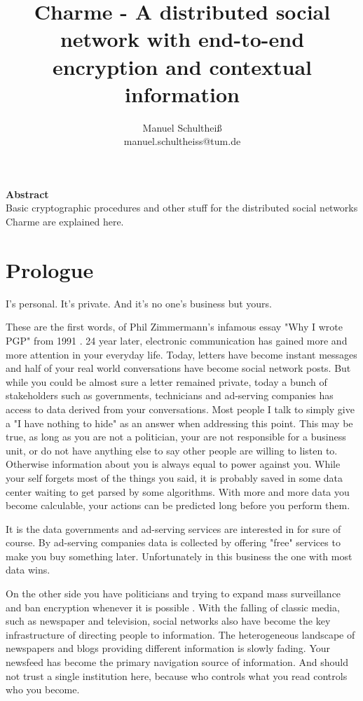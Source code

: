 \documentclass{scrartcl}
\title{Charme - A distributed social network with end-to-end encryption and contextual information}
\author{Manuel Schultheiß\\manuel.schultheiss@tum.de}
\begin{document}
  \sloppy %
 
\maketitle
\textbf{Abstract}\\
Basic cryptographic procedures and other stuff for the distributed social networks Charme are explained here.

\tableofcontents
 \newpage
\section{Prologue}

\begin{center}
I's personal. It's private.
And it's no one's business but yours.
\end{center}

These are the first words, of Phil Zimmermann's infamous essay "Why I wrote PGP" from 1991 \cite{PHIL}. 24 year later, electronic communication has gained more and more attention in your everyday life. Today, letters have become instant messages and half of your real world conversations have become social network posts. But while you could be almost sure a letter remained private, today a bunch of stakeholders such as governments, technicians and ad-serving companies has access to data derived from your conversations. 
Most people I talk to simply give a "I have nothing to hide" as an answer when addressing this point. This may be true, as long as you are not a politician, your are not responsible for a business unit, or do not have anything else to say other people are willing to listen to. Otherwise information about you is always equal to power against you. While your self forgets most of the things you said, it is probably saved in some data center waiting to get parsed by some algorithms. With more and more data you become calculable, your actions can be predicted long before you perform them.

 It is the data governments and ad-serving services are interested in for sure of course. By ad-serving companies data is collected by offering "free" services  to make you buy something later. Unfortunately in this business the one with most data wins.

On the other side you have politicians and trying to expand mass surveillance and ban encryption whenever it is possible \cite{EFF}. With the falling of classic media, such as newspaper and television, social networks also have become the key infrastructure of directing people to information. The heterogeneous  landscape of newspapers and blogs providing different information is slowly fading. Your newsfeed has become the primary navigation source of information. And should not trust a single institution  here, because who controls what you read controls who you become.
\end{document}
